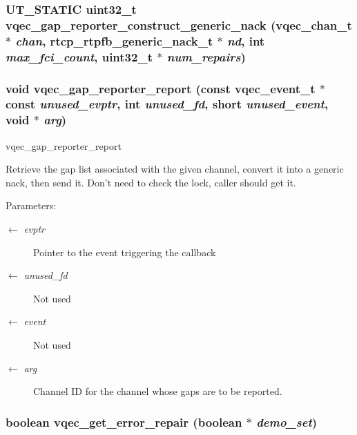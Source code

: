\subsubsection{\setlength{\rightskip}{0pt plus 5cm}UT\_\-STATIC uint32\_\-t vqec\_\-gap\_\-reporter\_\-construct\_\-generic\_\-nack (\bf{vqec\_\-chan\_\-t} $\ast$ {\em chan}, rtcp\_\-rtpfb\_\-generic\_\-nack\_\-t $\ast$ {\em nd}, int {\em max\_\-fci\_\-count}, uint32\_\-t $\ast$ {\em num\_\-repairs})}\label{vqec__gap__reporter_8c_a8d254e8da6176b759950e76e2d59976}


\subsubsection{\setlength{\rightskip}{0pt plus 5cm}void vqec\_\-gap\_\-reporter\_\-report (const vqec\_\-event\_\-t $\ast$const  {\em unused\_\-evptr}, int {\em unused\_\-fd}, short {\em unused\_\-event}, void $\ast$ {\em arg})}\label{vqec__gap__reporter_8c_f7691c0b7a828d2eca4e855f99ea0128}


vqec\_\-gap\_\-reporter\_\-report

Retrieve the gap list associated with the given channel, convert it into a generic nack, then send it. Don't need to check the lock, caller should get it.

\begin{Desc}
\item[Parameters:]
\begin{description}
\item[\mbox{$\leftarrow$} {\em evptr}]Pointer to the event triggering the callback \item[\mbox{$\leftarrow$} {\em unused\_\-fd}]Not used \item[\mbox{$\leftarrow$} {\em event}]Not used \item[\mbox{$\leftarrow$} {\em arg}]Channel ID for the channel whose gaps are to be reported. \end{description}
\end{Desc}
\subsubsection{\setlength{\rightskip}{0pt plus 5cm}boolean vqec\_\-get\_\-error\_\-repair (boolean $\ast$ {\em demo\_\-set})}\label{vqec__gap__reporter_8c_911bd113de88cc1e99ae67e17ce3b3e2}


